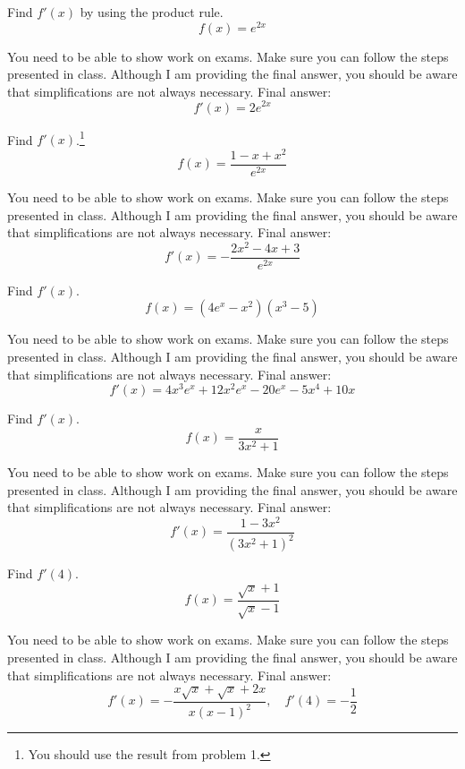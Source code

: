 \documentclass[12pt,addpoints, answers, fleqn]{exam}
\begin{document}
\begin{questions}


\question Find $f'\left(x\right)$ by using the product rule.
\[
f\left(x\right) = e^{2x}
\]

\begin{solution}
You need to be able to show work on exams. Make sure you can follow the steps presented in class. Although I am providing the final answer, you should be aware that simplifications are not always necessary.
Final answer:
\[
f'\left(x\right) =  2 e^{2x}
\]
\end{solution}

\question Find $f'\left(x\right)$.\footnote{You should use the result from problem 1.}
\[
f\left(x\right) = \frac{1-x+x^2}{e^{2x}}
\]

\begin{solution}
You need to be able to show work on exams. Make sure you can follow the steps presented in class. Although I am providing the final answer, you should be aware that simplifications are not always necessary.
Final answer:
\[
f'\left(x\right) =  -\frac{2x^2-4x+3}{e^{2x}}
\]
\end{solution}

\question Find $f'\left(x\right)$.
\[
f\left(x\right) = \left(4e^x-x^2\right) \left(x^3-5\right)
\]

\begin{solution}
You need to be able to show work on exams. Make sure you can follow the steps presented in class. Although I am providing the final answer, you should be aware that simplifications are not always necessary.
Final answer:
\[
f'\left(x\right) =  4x^3 e^x + 12x^2 e^x - 20 e^x - 5x^4 + 10x
\]
\end{solution}

\question Find $f'\left(x\right)$.
\[
f\left(x\right) = \frac{x}{3x^2+1}
\]

\begin{solution}
You need to be able to show work on exams. Make sure you can follow the steps presented in class. Although I am providing the final answer, you should be aware that simplifications are not always necessary.
Final answer:
\[
f'\left(x\right) =  \frac{1-3x^2}{\left( 3x^2 + 1 \right)^2}
\]
\end{solution}

\question Find $f'\left(4\right)$.
\[
f\left(x\right) = \frac{\sqrt{x}+1}{\sqrt{x}-1}
\]

\begin{solution}
You need to be able to show work on exams. Make sure you can follow the steps presented in class. Although I am providing the final answer, you should be aware that simplifications are not always necessary.
Final answer:
\[
f'\left(x\right) =  - \frac{x \sqrt{x} + \sqrt{x} + 2x }{x \left( x-1\right)^2}, \quad f'\left(4\right) = -\frac{1}{2}
\]
\end{solution}


\end{questions}
\end{document}
